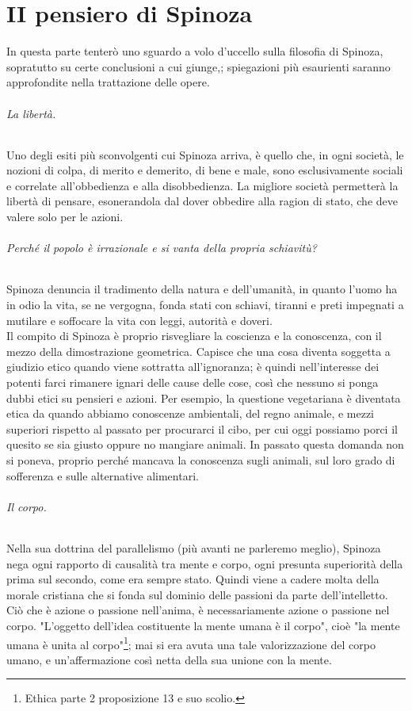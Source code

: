\chapter{II pensiero di Spinoza}
In questa parte tenterò uno sguardo a volo d'uccello sulla filosofia di Spinoza, sopratutto su certe conclusioni a cui giunge,; spiegazioni più esaurienti saranno approfondite nella trattazione delle opere.
\subparagraph{La libertà.} Uno degli esiti più sconvolgenti cui Spinoza arriva, è quello che, in ogni società, le nozioni di colpa, di merito e demerito, di bene e male, sono esclusivamente sociali e correlate all'obbedienza e alla disobbedienza. La migliore società  permetterà la libertà di pensare, esonerandola dal dover obbedire alla ragion di stato, che deve valere solo per le azioni.
\subparagraph{Perché il popolo è irrazionale e si vanta della propria schiavitù?} Spinoza denuncia il tradimento della natura e dell'umanità, in quanto l'uomo ha in odio la vita, se ne vergogna, fonda stati con schiavi, tiranni e preti impegnati a mutilare e soffocare la vita con leggi, autorità e doveri.\\
Il compito di Spinoza è proprio risvegliare la coscienza e la conoscenza, con il mezzo della dimostrazione geometrica. Capisce che una cosa diventa soggetta a giudizio etico quando viene sottratta all'ignoranza; è quindi nell'interesse dei potenti farci rimanere ignari delle cause delle cose, così che nessuno si ponga dubbi etici su pensieri e azioni. Per esempio, la questione vegetariana è diventata etica da quando abbiamo conoscenze ambientali, del regno animale, e mezzi superiori rispetto al passato per procurarci il cibo, per cui oggi possiamo porci il quesito se sia giusto oppure no mangiare animali. In passato questa domanda non si poneva, proprio perché mancava la conoscenza sugli animali, sul loro grado di sofferenza e sulle alternative alimentari.
\subparagraph{Il corpo.} Nella sua dottrina del parallelismo (più avanti ne parleremo meglio), Spinoza nega ogni rapporto di causalità tra mente e corpo, ogni presunta superiorità della prima sul secondo, come era sempre stato. Quindi viene a cadere molta della morale cristiana che si fonda sul dominio delle passioni da parte dell'intelletto.\\
Ciò che è azione o passione nell'anima, è necessariamente azione o passione nel corpo. "L'oggetto dell'idea costituente la mente umana è il corpo", cioè "la mente umana è unita al corpo"\footnote{Ethica parte 2 proposizione 13 e suo scolio.}; mai si era avuta una tale valorizzazione del corpo umano, e un'affermazione così netta della sua unione con la mente.
